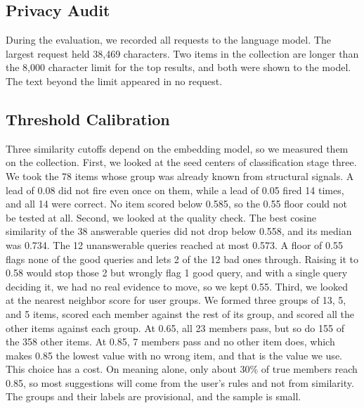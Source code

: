 \documentclass[conference]{IEEEtran}
\begin{document}
\subsection{Privacy Audit}
During the evaluation, we recorded all requests to the language model. The largest request held 38,469 characters. Two items in the collection are longer than the 8,000 character limit for the top results, and both were shown to the model. The text beyond the limit appeared in no request.

\subsection{Threshold Calibration}
Three similarity cutoffs depend on the embedding model, so we measured them on the collection. First, we looked at the seed centers of classification stage three. We took the 78 items whose group was already known from structural signals. A lead of 0.08 did not fire even once on them, while a lead of 0.05 fired 14 times, and all 14 were correct. No item scored below 0.585, so the 0.55 floor could not be tested at all. Second, we looked at the quality check. The best cosine similarity of the 38 answerable queries did not drop below 0.558, and its median was 0.734. The 12 unanswerable queries reached at most 0.573. A floor of 0.55 flags none of the good queries and lets 2 of the 12 bad ones through. Raising it to 0.58 would stop those 2 but wrongly flag 1 good query, and with a single query deciding it, we had no real evidence to move, so we kept 0.55. Third, we looked at the nearest neighbor score for user groups. We formed three groups of 13, 5, and 5 items, scored each member against the rest of its group, and scored all the other items against each group. At 0.65, all 23 members pass, but so do 155 of the 358 other items. At 0.85, 7 members pass and no other item does, which makes 0.85 the lowest value with no wrong item, and that is the value we use. This choice has a cost. On meaning alone, only about 30\% of true members reach 0.85, so most suggestions will come from the user's rules and not from similarity. The groups and their labels are provisional, and the sample is small.

\end{document}
